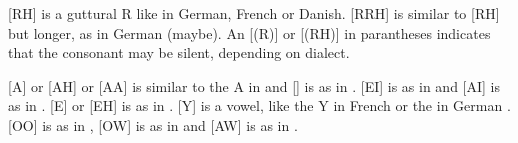 [RH] is a guttural R like in German, French or Danish. 
[RRH] is similar to [RH] but longer, as in German  (maybe). 
An [(R)] or [(RH)] in parantheses indicates that the consonant may be silent, depending on dialect. 

[A] or [AH] or [AA] is similar to the  A in  and [\Aumlaut{}] is as in . 
[EI] is as in  and [AI] is as in . 
[E] or [EH] is as in . 
[Y] is a vowel, like the  Y in French  or the  in German . 
[OO] is as in , [OW] is as in  and [AW] is as in . 









